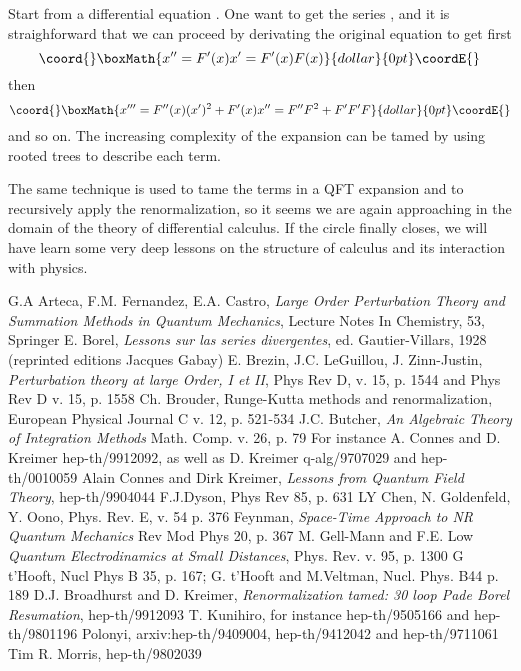\documentclass[a4paper,a4paper]{article}
\begin{document}
Start from a differential equation  \coordHE{}. One want to get the series
\coordHE{}, and it is straighforward that we can proceed
by derivating the original equation to get first
$$\coord{}\boxMath{x''= F'(x) x'  =  F'(x) F(x)}{dollar}{0pt}\coordE{}$$
then
$$\coord{}\boxMath{x'''=F''(x) (x')^2 + F'(x) x'' = F'' F^2 + F' F' F }{dollar}{0pt}\coordE{}$$
and so on. The increasing complexity of the expansion can be tamed by using rooted 
trees to describe each term\cite{conn.l}.

The same technique is used to tame the terms in a QFT expansion and to recursively
apply the renormalization, so it seems we are again approaching in the domain of
the theory of differential calculus. If the circle finally closes, we will have learn 
some very deep lessons on the structure of calculus and its interaction with physics.



\begin{thebibliography}{30}

 G.A Arteca, F.M. Fernandez, E.A. Castro, {\it Large Order Perturbation Theory and 
Summation Methods in Quantum Mechanics}, Lecture Notes In Chemistry, 53, Springer
  E. Borel, {\it Lessons sur las series divergentes}, 
  ed. Gautier-Villars, 1928 (reprinted  editions Jacques Gabay)
  E. Brezin, J.C. LeGuillou, J. Zinn-Justin, { \it Perturbation theory at 
large Order, I et II}, Phys Rev D, v. 15, p. 1544 and Phys Rev D v. 15, p. 1558
  Ch. Brouder, {Runge-Kutta methods and renormalization}, European 
Physical Journal C v. 12, p. 521-534
 J.C. Butcher, {\it An Algebraic Theory of Integration 
                                Methods} Math. Comp. v. 26, p. 79
 For instance A. Connes and D. Kreimer hep-th/9912092, as well as D. Kreimer 
                 q-alg/9707029 and hep-th/0010059
 Alain Connes and Dirk Kreimer, {\it Lessons from Quantum Field 
   Theory}, hep-th/9904044
 F.J.Dyson, Phys Rev 85, p. 631
 LY Chen, N. Goldenfeld, Y. Oono, Phys. Rev. E, v. 54 p. 376
 Feynman, {\it Space-Time Approach to NR Quantum Mechanics} Rev Mod 
                  Phys 20, p. 367
 M. Gell-Mann and F.E. Low {\it Quantum Electrodinamics at Small Distances}, 
Phys. Rev. v. 95, p. 1300
  G t'Hooft, Nucl Phys B 35, p. 167; G. t'Hooft and M.Veltman, Nucl. Phys. B44 p. 189
 D.J. Broadhurst and D. Kreimer, {\it Renormalization tamed: 30 loop Pade Borel 
Resumation}, hep-th/9912093
  T. Kunihiro, for instance hep-th/9505166 and hep-th/9801196
 Polonyi, arxiv:hep-th/9409004, hep-th/9412042 and hep-th/9711061
 Tim R. Morris, hep-th/9802039
\end{thebibliography}
\end{document}
